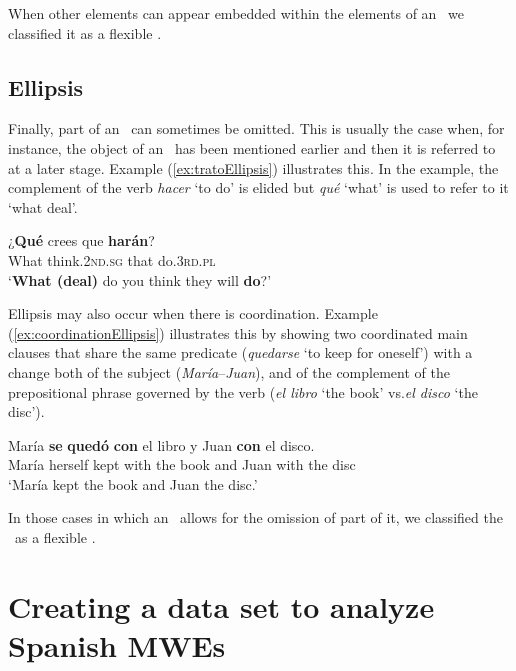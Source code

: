 \documentclass[output=paper]{langsci/langscibook}
\begin{document}
When other elements can appear embedded within the elements of an \mwe\ we classified it as a flexible \mwe.

\subsection{Ellipsis}
\label{ssec:ellipsis}
Finally, part of an \mwe\ can sometimes be omitted. 
This is usually the case when, for instance, the object of an \mwe\ has been mentioned earlier and then it is referred to at a later stage.
Example (\ref{ex:tratoEllipsis}) illustrates this. 
In the example, the complement of the verb \textit{hacer} `to do' is elided but \textit{qué} `what' is used to refer to it `what deal'.

\begin{exe}
\ex \label{ex:tratoEllipsis}
\gll ¿\textbf{Qué} crees que \textbf{harán}? \\
What think.\textsc{2nd.sg} that do.\textsc{3rd.pl} \\
\glt `\textbf{What (deal)} do you think they will \textbf{do}?'
\end{exe}

Ellipsis may also occur when there is coordination. 
Example (\ref{ex:coordinationEllipsis}) illustrates this by showing two coordinated main clauses that share the same predicate (\textit{quedarse} `to keep for oneself') with a change both of the subject (\textit{María}--\textit{Juan}), and of the complement of the prepositional phrase governed by the verb (\textit{el libro} `the book' vs.\@ \textit{el disco} `the disc').

\begin{exe}
\ex \label{ex:coordinationEllipsis}
\gll María \textbf{se} \textbf{quedó} \textbf{con} el libro y Juan \textbf{con} el disco. \\
María herself kept with the book and Juan with the disc\\
\glt `María kept the book and Juan the disc.'
\end{exe}

In those cases in which an \mwe\ allows for the omission of part of it, we classified the \mwe\ as a flexible \mwe.

\section{Creating a data set to analyze Spanish MWEs}
\label{sec:dataset}
\end{document}
